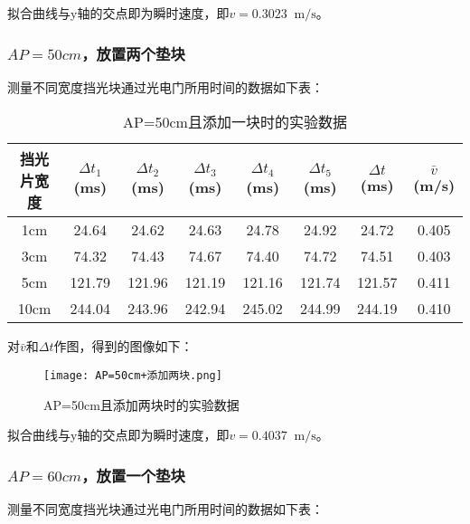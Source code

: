\documentclass[11pt]{article}
\newcommand*{\unit}[1]{\mathop{}\!\mathrm{#1}}
\begin{document}
拟合曲线与y轴的交点即为瞬时速度，即$v=0.3023 \unit{m/s}$。

\subsubsection{$AP = 50cm$，放置两个垫块}

测量不同宽度挡光块通过光电门所用时间的数据如下表：

\begin{table}[H]
    \centering
    \caption{AP=50cm且添加一块时的实验数据}
    \begin{tabular}{|c|c|c|c|c|c|c|c|}
        \hline
        挡光片宽度&$\Delta t_1$(ms)&$\Delta t_2$(ms)&$\Delta t_3$(ms)&$\Delta t_4$(ms)&$\Delta t_5$(ms)&$\Delta t$(ms)&$\bar{v}$(m/s)\\
        \hline
        1cm&24.64  & 24.62  & 24.63  & 24.78  & 24.92  & 24.72  & 0.405    \\
        \hline
        3cm&74.32  & 74.43  & 74.67  & 74.40  & 74.72  & 74.51  & 0.403    \\
        \hline
        5cm&121.79  & 121.96  & 121.19  & 121.16  & 121.74  & 121.57  & 0.411    \\
        \hline
        10cm&244.04  & 243.96  & 242.94  & 245.02  & 244.99  & 244.19  & 0.410    \\
        \hline
    \end{tabular}
\end{table}

对$\bar{v}$和$\Delta t$作图，得到的图像如下：

\begin{figure}[H]
    \centering
    \texttt{[image: AP=50cm+添加两块.png]}
    \caption{AP=50cm且添加两块时的实验数据}
\end{figure}

拟合曲线与y轴的交点即为瞬时速度，即$v=0.4037 \unit{m/s}$。

\subsubsection{$AP = 60cm$，放置一个垫块}

测量不同宽度挡光块通过光电门所用时间的数据如下表：
\end{document}
